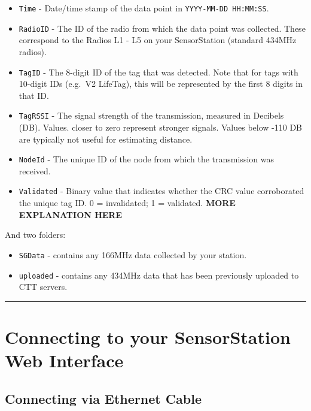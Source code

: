 \documentclass[
]{article}
\providecommand{\tightlist}{%
  \setlength{\itemsep}{0pt}\setlength{\parskip}{0pt}}
\begin{document}
\begin{itemize}
  \begin{itemize}
  \tightlist
  \item
    \texttt{Time} - Date/time stamp of the data point in
    \texttt{YYYY-MM-DD\ HH:MM:SS}.
  \item
    \texttt{RadioID} - The ID of the radio from which the data point was
    collected. These correspond to the Radios L1 - L5 on your
    SensorStation (standard 434MHz radios).
  \item
    \texttt{TagID} - The 8-digit ID of the tag that was detected. Note
    that for tags with 10-digit IDs (e.g.~V2 LifeTag), this will be
    represented by the first 8 digits in that ID.
  \item
    \texttt{TagRSSI} - The signal strength of the transmission, measured
    in Decibels (DB). Values. closer to zero represent stronger signals.
    Values below -110 DB are typically not useful for estimating
    distance.
  \item
    \texttt{NodeId} - The unique ID of the node from which the
    transmission was received.
  \item
    \texttt{Validated} - Binary value that indicates whether the CRC
    value corroborated the unique tag ID. 0 = invalidated; 1 =
    validated. \textbf{MORE EXPLANATION HERE}
  \end{itemize}
\end{itemize}

And two folders:

\begin{itemize}
\tightlist
\item
  \texttt{SGData} - contains any 166MHz data collected by your station.
\item
  \texttt{uploaded} - contains any 434MHz data that has been previously
  uploaded to CTT servers.
\end{itemize}

\begin{center}\rule{0.5\linewidth}{0.5pt}\end{center}

\hypertarget{connecting-to-your-sensorstation-web-interface}{%
\section{Connecting to your SensorStation Web
Interface}\label{connecting-to-your-sensorstation-web-interface}}

\hypertarget{connecting-via-ethernet-cable}{%
\subsection{Connecting via Ethernet
Cable}\label{connecting-via-ethernet-cable}}
\end{document}
